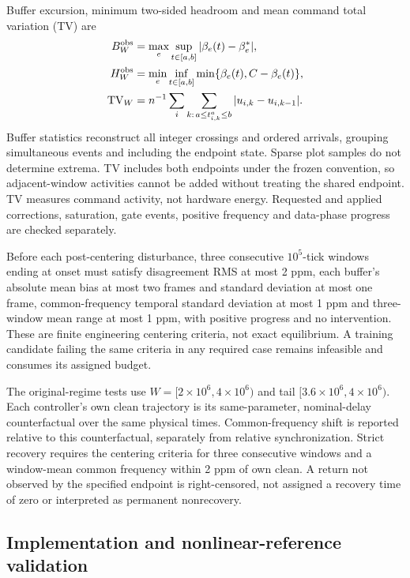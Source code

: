 Buffer excursion, minimum two-sided headroom and mean command total
variation (TV) are
\begin{align}
 B_W^{\rm obs}&=\max_e\sup_{t\in[a,b]}|\beta_e(t)-\beta_e^*|,\nonumber\\
 H_W^{\rm obs}&=\min_e\inf_{t\in[a,b]}
                         \min\{\beta_e(t),C-\beta_e(t)\},
 \label{detail:eq:eval_buffer_metrics}\\
 \mathrm{TV}_W&=n^{-1}\sum_i
       \sum_{k:\,a\le t^a_{i,k}\le b}|u_{i,k}-u_{i,k-1}|.
 \label{detail:eq:eval_tv}
\end{align}
Buffer statistics reconstruct all integer crossings and ordered arrivals,
grouping simultaneous events and including the endpoint state. Sparse
plot samples do not determine extrema. TV includes both endpoints under
the frozen convention, so adjacent-window activities cannot be added
without treating the shared endpoint. TV measures command activity,
not hardware energy. Requested and applied corrections, saturation,
gate events, positive frequency and data-phase progress are checked
separately.

Before each post-centering disturbance, three consecutive $10^5$-tick
windows ending at onset must satisfy disagreement RMS at most 2 ppm,
each buffer's absolute mean bias at most two frames and standard
deviation at most one frame, common-frequency temporal standard
deviation at most 1 ppm and three-window mean range at most 1 ppm,
with positive progress and no intervention. These are finite
engineering centering criteria, not exact equilibrium. A training
candidate failing the same criteria in any required case remains
infeasible and consumes its assigned budget.

The original-regime tests use $W=[2\times10^6,4\times10^6)$ and tail
$[3.6\times10^6,4\times10^6)$. Each controller's own clean trajectory
is its same-parameter, nominal-delay counterfactual over the same
physical times. Common-frequency shift is reported relative to this
counterfactual, separately from relative synchronization. Strict
recovery requires the centering criteria for three consecutive windows
and a window-mean common frequency within 2 ppm of own clean. A return
not observed by the specified endpoint is right-censored, not assigned
a recovery time of zero or interpreted as permanent nonrecovery.

\subsection{Implementation and nonlinear-reference validation}
\label{detail:subsec:eval_implementation_reference}

